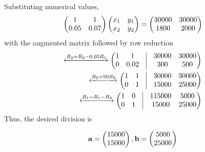 Substituting numerical values, 
\begin{align}
  \begin{pmatrix} 1&1\\0.05&0.07\end{pmatrix}\begin{pmatrix} x_1&y_1\\x_2&y_2\end{pmatrix} = \begin{pmatrix} 30000&30000\\1800&2000\end{pmatrix} \nonumber \\
\end{align}
with the augmented matrix followed by row reduction 
\begin{align}
	\xleftrightarrow{R_2 = R_2 - 0.05 R_1}\myvec{1&1 &\vrule &  30000&30000\\ 0&0.02 & \vrule& 300&500}   \nonumber \\
	\xleftrightarrow{R_2 = 50R_2}\myvec{1&1&\vrule& 30000&30000 \\ 0&1 & \vrule &15000&25000} \nonumber \\
	\xleftrightarrow{R_1 = R_1-R_2}\myvec{1&0 & \vrule &115000&5000\\ 0&1& \vrule &15000&25000}\label{ans}
\end{align}
Thus, the desired division is

\begin{align}
	\mathbf{a} = \begin{pmatrix} 15000 \\ 15000\end{pmatrix},  \mathbf{b} = \begin{pmatrix} 5000 \\ 25000\end{pmatrix} 
\end{align}

